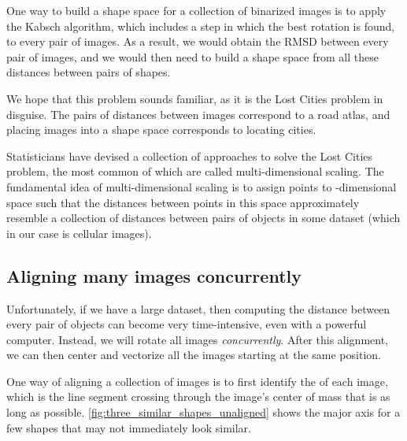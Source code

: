One way to build a shape space for a collection of binarized images is to apply the Kabsch algorithm, which includes a step in which the best rotation is found, to every pair of images. As a result, we would obtain the RMSD between every pair of images, and we would then need to build a shape space from all these distances between pairs of shapes.\\

\begin{note}\end{note}

We hope that this problem sounds familiar, as it is the Lost Cities problem in disguise. The pairs of distances between images correspond to a road atlas, and placing images into a shape space corresponds to locating cities.

Statisticians have devised a collection of approaches to solve the Lost Cities problem, the most common of which are called multi-dimensional scaling. The fundamental idea of multi-dimensional scaling is to assign points to -dimensional space such that the distances between points in this space approximately resemble a collection of distances between pairs of objects in some dataset (which in our case is cellular images).\\

\begin{qbox}\end{qbox}

\FloatBarrier
{}
\subsection{Aligning many images concurrently}

Unfortunately, if we have a large dataset, then computing the distance between every pair of objects can become very time-intensive, even with a powerful computer. Instead, we will rotate all images \textit{concurrently}. After this alignment, we can then center and vectorize all the images starting at the same position.

One way of aligning a collection of images is to first identify the  of each image, which is the line segment crossing through the image's center of mass that is as long as possible. \autoref{fig:three_similar_shapes_unaligned} shows the major axis for a few shapes that may not immediately look similar.

